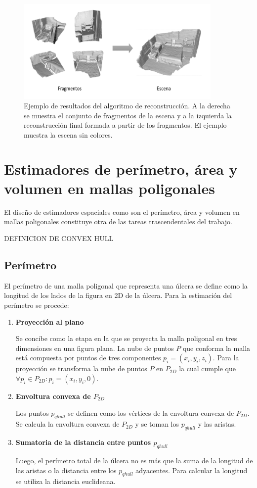 \begin{figure}[h]
	\centering
	\includegraphics[width=10cm]{./Graphics/algo3d.png}
	\caption{Ejemplo de resultados del algoritmo de reconstrucción. A la derecha se muestra el conjunto de fragmentos de la escena y a la izquierda la reconstrucción final formada a partir de los fragmentos. El ejemplo muestra la escena sin colores.}
\end{figure}

\section{Estimadores de perímetro, área y volumen en mallas poligonales}\label{section:measure}

El diseño de estimadores espaciales como son el perímetro, área y volumen en mallas poligonales constituye otra de las tareas trascendentales del trabajo. 

DEFINICION DE CONVEX HULL

\subsection{Perímetro}

El perímetro de una malla poligonal que representa una úlcera se define como la longitud de los lados de la figura en 2D de la úlcera. Para la estimación del perímetro se procede:

\begin{enumerate}
	\item \textbf{Proyección al plano}
	
	Se concibe como la etapa en la que se proyecta la malla poligonal en tres dimensiones en una figura plana. La nube de puntos $P$ que conforma la malla está compuesta por puntos de tres componentes $p_i = (x_i, y_i, z_i)$. Para la proyección se transforma la nube de puntos $P$ en $P_{2D}$ la cual cumple que $\forall p_i \in P_{2D}: p_i = (x_i, y_i, 0)$.
	
	\item \textbf{Envoltura convexa de $P_{2D}$}
	
	Los puntos $p_{qhull}$ se definen como los vértices de la envoltura convexa de $P_{2D}$. Se calcula la envoltura convexa de $P_{2D}$ y se toman los $p_{qhull}$ y las aristas.
	
	\item \textbf{Sumatoria de la distancia entre puntos $p_{qhull}$}
	
	Luego, el perímetro total de la úlcera no es más que la suma de la longitud de las aristas o la distancia entre los $p_{qhull}$ adyacentes. Para calcular la longitud se utiliza la distancia euclideana.
	
\end{enumerate}

